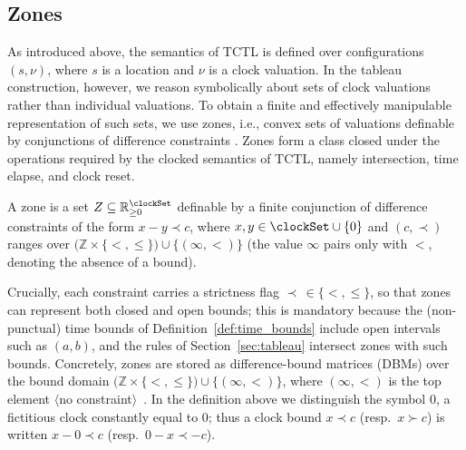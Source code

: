 \subsection{Zones}
As introduced above, the semantics of TCTL is defined over configurations $(s,\nu)$, where $s$ is a location and $\nu$ is a clock valuation.
In the tableau construction, however, we reason symbolically about
sets of clock valuations rather than individual valuations.
To obtain a finite and effectively manipulable representation
of such sets, we use zones, i.e., convex sets of valuations
definable by conjunctions of difference constraints \cite{Bouyer05TimedAutomata,AlurDill1994}.
Zones form a class closed under the operations required
by the clocked semantics of TCTL, namely intersection,
time elapse, and clock reset.

\begin{definition}[Zones]\label{def:zones}
A {zone} is a set $Z \subseteq \mathbb{R}_{\ge 0}^{\clockSet}$
definable by a finite conjunction of {difference constraints}
of the form $x - y \prec c$,
where $x,y \in \clockSet \cup \{0\}$ and $(c,\prec)$ ranges over $\big(\mathbb{Z}\times\{<,\le\}\big)\cup\{(\infty,<)\}$ (the value $\infty$ pairs only with $<$, denoting the absence of a bound).
\end{definition}

Crucially, each constraint carries a {strictness flag} $\prec\,\in\{<,\le\}$, so that zones can represent both closed and open bounds; this is mandatory because the (non-punctual) time bounds of Definition~\ref{def:time_bounds} include open intervals such as $(a,b)$, and the rules of Section~\ref{sec:tableau} intersect zones with such bounds. Concretely, zones are stored as {difference-bound matrices} (DBMs) over the bound domain $\big(\mathbb{Z}\times\{<,\le\}\big)\cup\{(\infty,<)\}$, where $(\infty,<)$ is the top element $\langle$no constraint$\rangle$~\cite{Bouyer05TimedAutomata,AlurDill1994}. In the definition above we distinguish the symbol $0$, a fictitious clock constantly equal to $0$; thus a clock bound $x \prec c$ (resp.\ $x \succ c$) is written $x - 0 \prec c$ (resp.\ $0 - x \prec -c$).

